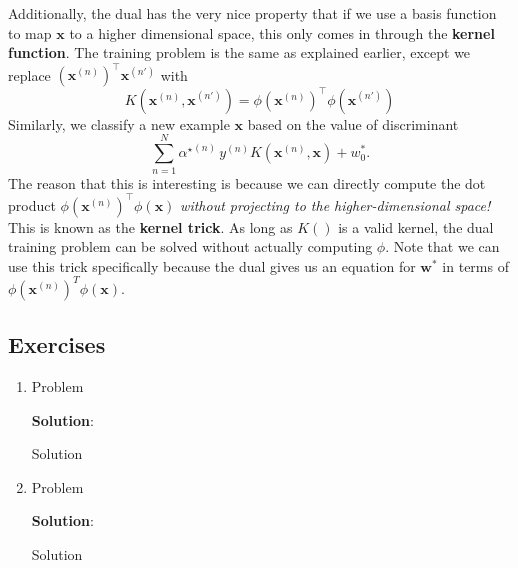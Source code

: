 \documentclass[11pt, letterpaper]{article}
\theoremstyle{definition}
\theoremstyle{plain}
\newenvironment{solution}{
    \vspace{2mm}
    \color{blue}\noindent\textbf{Solution}:
}{}
\begin{document}
Additionally, the dual has the very nice property that
if we use a basis function to map $\bm{x}$ to a higher dimensional space, this only comes in through the \textbf{kernel function}. The training problem is the same as explained earlier, except we replace
$(\bm{x}^{(n)})^\top \bm{x}^{(n')}$ with
\[K(\bm{x}^{(n)},\bm{x}^{(n')}) = \phi(\bm{x}^{(n)})^\top\phi(\bm{x}^{(n')})\]
Similarly, we classify a new example $\bm{x}$
based on the value of discriminant
\[\sum_{n=1}^N{\alpha^\star}^{(n)} \,y^{(n)}K(\bm{x}^{(n)},\bm{x}) +w_0^*.\]
The reason that this is interesting
is because we can directly compute the dot product
$\phi(\bm{x}^{(n)})^\top\phi(\bm{x})$
{\em without projecting to the higher-dimensional space!}
This is known as the \textbf{kernel trick}. As long as $K()$ is a valid kernel, the dual training problem can be solved without actually computing $\phi$. Note that we can use this trick specifically because the dual gives us an equation for $\bm{w}^*$ in terms of $\phi(\bm{x}^{(n)})^T\phi(\bm{x})$.



\subsection{Exercises}

\begin{mdframed}
    \begin{enumerate}
        \item Problem
        
        \begin{solution}
            Solution
        \end{solution}

        \item Problem
        
        \begin{solution}
            Solution
        \end{solution}
    \end{enumerate}
\end{mdframed}
\end{document}

